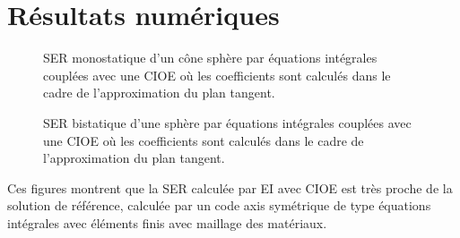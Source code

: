 \section{Résultats numériques}

  \begin{figure}[!hbt]
    \centering
    
    \caption{SER monostatique d'un cône sphère par équations intégrales couplées avec une CIOE où les coefficients sont calculés dans le cadre de l'approximation du plan tangent.}
    \label{fig:ser:cone-sphere-mono-M1}
  \end{figure}

  \begin{figure}[!hbt]
    \centering
    
    \caption{SER bistatique d'une sphère par équations intégrales couplées avec une CIOE où les coefficients sont calculés dans le cadre de l'approximation du plan tangent.}
    \label{fig:ser:sphere-bis-M1}
  \end{figure}

  Ces figures montrent que la SER calculée par EI avec CIOE est très proche de la solution de référence, calculée par un code axis symétrique de type équations intégrales avec éléments finis avec maillage des matériaux.
